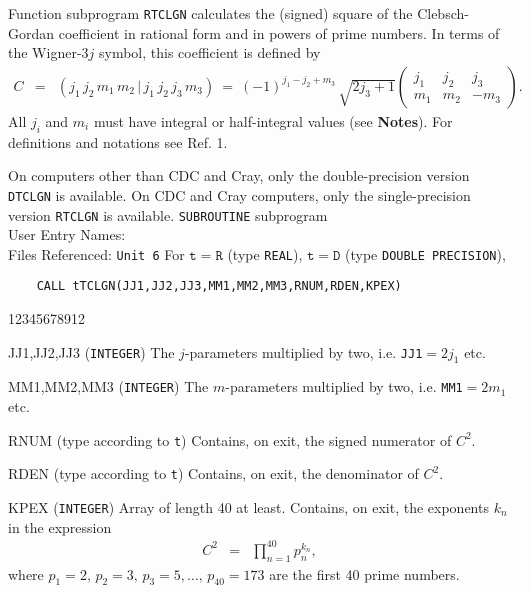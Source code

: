                     
   
\Submitter{}             
Function subprogram {\tt RTCLGN} calculates the (signed) square of
the Clebsch-Gordan coefficient in rational form and in powers of
prime numbers. In terms of the Wigner-3$j$ symbol, this
coefficient is defined by
\begin{eqnarray*}
C & = & (j_1\,j_2\,m_1\,m_2\,|\,j_1\,j_2\,j_3\,m_3)
\ = \ \displaystyle (-1)^{j_1-j_2+m_3}\,\sqrt{2j_3+1}
\left(\begin{array}{ccc}
j_1 & j_2 & j_3 \\ m_1 & m_2 & -m_3 \end{array}\right).
\end{eqnarray*}
All $j_i$ and $m_i$ must have integral or half-integral values
(see {\bf Notes}). For definitions and notations see Ref. 1.
\par
On computers other than CDC and Cray, only the double-precision version
{\tt DTCLGN} is available. On CDC and Cray computers, only the
single-precision version {\tt RTCLGN} is available.
\Structure
{\tt SUBROUTINE} subprogram \\
User Entry Names:  \\
Files Referenced: {\tt Unit 6}
\Usage
For $\mathtt{t=R}$ (type {\tt REAL}), $\mathtt{t=D}$ (type
{\tt DOUBLE PRECISION}),
\begin{verbatim}
    CALL tTCLGN(JJ1,JJ2,JJ3,MM1,MM2,MM3,RNUM,RDEN,KPEX)
\end{verbatim}
\begin{DLtt}{12345678912}
\item[JJ1,JJ2,JJ3] ({\tt INTEGER}) The $j$-parameters multiplied by
two, i.e. {\tt JJ1}$=2j_1$ etc.
\item[MM1,MM2,MM3] ({\tt INTEGER}) The $m$-parameters multiplied by
two, i.e. {\tt MM1}$=2m_1$ etc.
\item[RNUM] (type according to {\tt t}) Contains, on exit,
the signed numerator of $C^2$.
\item[RDEN] (type according to {\tt t}) Contains, on exit, the
denominator of $C^2$.
\item[KPEX] ({\tt INTEGER}) Array of length 40 at least. Contains, on
exit, the exponents $k_n$ in the expression
\begin{eqnarray*}
C^2 & = & \displaystyle \prod_{n=1}^{40} p_n^{k_n},
\end{eqnarray*}
where $p_1=2,\,p_2=3,\,p_3=5,\ldots,\,p_{40}=173$ are the first 40
prime numbers.
\end{DLtt}
